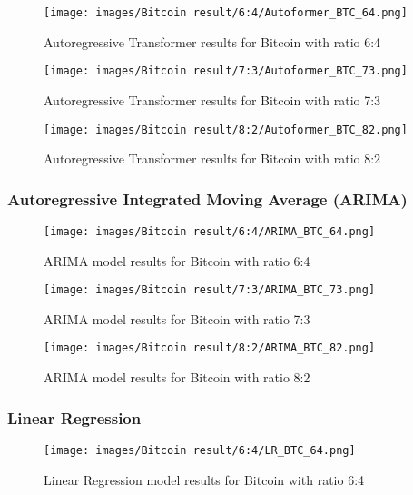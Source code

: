 \documentclass{ieeeojies}
\begin{document}
\begin{figure}[H]
  \centering
\texttt{[image: images/Bitcoin result/6:4/Autoformer\_BTC\_64.png]}
  \caption{Autoregressive Transformer results for Bitcoin with ratio 6:4}
  \label{fig:autoformer_btc_64}
\end{figure}
\begin{figure}[H]
  \centering
\texttt{[image: images/Bitcoin result/7:3/Autoformer\_BTC\_73.png]}
  \caption{Autoregressive Transformer results for Bitcoin with ratio 7:3}
  \label{fig:autoformer_btc_73}
\end{figure}
\begin{figure}[H]
  \centering
\texttt{[image: images/Bitcoin result/8:2/Autoformer\_BTC\_82.png]}
  \caption{Autoregressive Transformer results for Bitcoin with ratio 8:2}
  \label{fig:autoformer_btc_82}
\end{figure}

\subsubsection{Autoregressive Integrated Moving Average (ARIMA)}
\begin{figure}[H]
  \centering
\texttt{[image: images/Bitcoin result/6:4/ARIMA\_BTC\_64.png]}\\
  \caption{ARIMA model results for Bitcoin with ratio 6:4}
  \label{fig:arima_btc_64}
\end{figure}

\begin{figure}[H]
  \centering
\texttt{[image: images/Bitcoin result/7:3/ARIMA\_BTC\_73.png]}\\
  \caption{ARIMA model results for Bitcoin with ratio 7:3}
  \label{fig:arima_btc_73}
\end{figure}

\begin{figure}[H]
  \centering
\texttt{[image: images/Bitcoin result/8:2/ARIMA\_BTC\_82.png]}\\ 
  \caption{ARIMA model results for Bitcoin with ratio 8:2}
  \label{fig:arima_btc_82}
\end{figure}


\subsubsection{Linear Regression}
\begin{figure}[H]
  \centering
\texttt{[image: images/Bitcoin result/6:4/LR\_BTC\_64.png]}\\
  \caption{Linear Regression model results for Bitcoin with ratio 6:4}
  \label{fig:lr_btc_64}
\end{figure}
\end{document}
